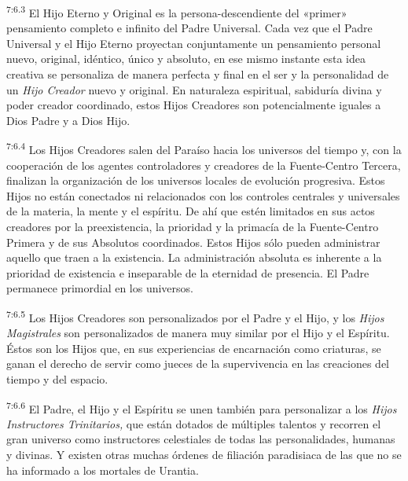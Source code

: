 \par
\textsuperscript{7:6.3} El Hijo Eterno y Original es la persona-descendiente del «primer» pensamiento completo e infinito del Padre Universal. Cada vez que el Padre Universal y el Hijo Eterno proyectan conjuntamente un pensamiento personal nuevo, original, idéntico, único y absoluto, en ese mismo instante esta idea creativa se personaliza de manera perfecta y final en el ser y la personalidad de un \textit{Hijo Creador} nuevo y original. En naturaleza espiritual, sabiduría divina y poder creador coordinado, estos Hijos Creadores son potencialmente iguales a Dios Padre y a Dios Hijo.

\par
\textsuperscript{7:6.4} Los Hijos Creadores salen del Paraíso hacia los universos del tiempo y, con la cooperación de los agentes controladores y creadores de la Fuente-Centro Tercera, finalizan la organización de los universos locales de evolución progresiva. Estos Hijos no están conectados ni relacionados con los controles centrales y universales de la materia, la mente y el espíritu. De ahí que estén limitados en sus actos creadores por la preexistencia, la prioridad y la primacía de la Fuente-Centro Primera y de sus Absolutos coordinados. Estos Hijos sólo pueden administrar aquello que traen a la existencia. La administración absoluta es inherente a la prioridad de existencia e inseparable de la eternidad de presencia. El Padre permanece primordial en los universos.

\par
\textsuperscript{7:6.5} Los Hijos Creadores son personalizados por el Padre y el Hijo, y los \textit{Hijos Magistrales} son personalizados de manera muy similar por el Hijo y el Espíritu. Éstos son los Hijos que, en sus experiencias de encarnación como criaturas, se ganan el derecho de servir como jueces de la supervivencia en las creaciones del tiempo y del espacio.

\par
\textsuperscript{7:6.6} El Padre, el Hijo y el Espíritu se unen también para personalizar a los \textit{Hijos Instructores Trinitarios,} que están dotados de múltiples talentos y recorren el gran universo como instructores celestiales de todas las personalidades, humanas y divinas. Y existen otras muchas órdenes de filiación paradisiaca de las que no se ha informado a los mortales de Urantia.

